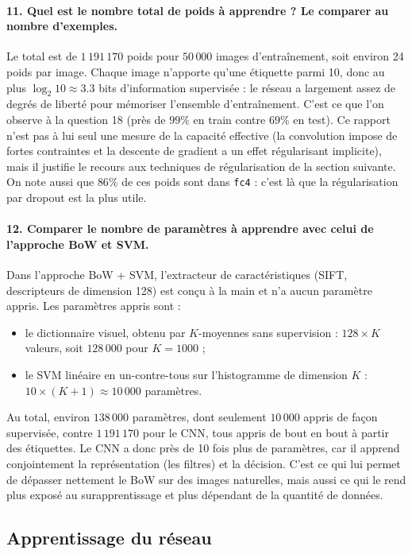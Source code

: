 \documentclass{report}
\begin{document}
\paragraph{11. Quel est le nombre total de poids à apprendre ? Le comparer au nombre d'exemples.}
 Le total est de $1\,191\,170$ poids pour $50\,000$ images d'entraînement, soit environ 24 poids par image. Chaque image n'apporte qu'une étiquette parmi 10, donc au plus $\log_2 10 \approx 3.3$ bits d'information supervisée : le réseau a largement assez de degrés de liberté pour mémoriser l'ensemble d'entraînement. C'est ce que l'on observe à la question 18 (près de $99\%$ en train contre $69\%$ en test). Ce rapport n'est pas à lui seul une mesure de la capacité effective (la convolution impose de fortes contraintes et la descente de gradient a un effet régularisant implicite), mais il justifie le recours aux techniques de régularisation de la section suivante. On note aussi que $86\%$ de ces poids sont dans \texttt{fc4} : c'est là que la régularisation par dropout est la plus utile.

\paragraph{12. Comparer le nombre de paramètres à apprendre avec celui de l'approche BoW et SVM.}
 Dans l'approche BoW + SVM, l'extracteur de caractéristiques (SIFT, descripteurs de dimension 128) est conçu à la main et n'a aucun paramètre appris. Les paramètres appris sont :
\begin{itemize}
    \item le dictionnaire visuel, obtenu par $K$-moyennes sans supervision : $128 \times K$ valeurs, soit $128\,000$ pour $K = 1000$ ;
    \item le SVM linéaire en un-contre-tous sur l'histogramme de dimension $K$ : $10 \times (K + 1) \approx 10\,000$ paramètres.
\end{itemize}
Au total, environ $138\,000$ paramètres, dont seulement $10\,000$ appris de façon supervisée, contre $1\,191\,170$ pour le CNN, tous appris de bout en bout à partir des étiquettes. Le CNN a donc près de 10 fois plus de paramètres, car il apprend conjointement la représentation (les filtres) et la décision. C'est ce qui lui permet de dépasser nettement le BoW sur des images naturelles, mais aussi ce qui le rend plus exposé au surapprentissage et plus dépendant de la quantité de données.

\subsection{Apprentissage du réseau}
\end{document}
